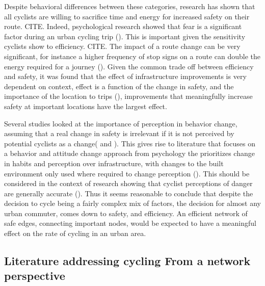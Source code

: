 \documentclass[11pt]{article} %
\begin{document}
Despite behavioral differences between these categories, research has shown that all cyclists are willing to sacrifice time and energy for increased safety on their route. CITE. Indeed, psychological research showed that fear is a significant factor during an urban cycling trip (\cite{ellett2018state}). This is important given the sensitivity cyclists show to efficiency. CITE. The impact of a route change can be very significant, for instance a higher frequency of stop signs on a route can double the energy required for a journey (\cite{fajans2001bicyclists}). Given the common trade off between efficiency and safety, it was found that the effect of infrastructure improvements is very dependent on context, effect is a function of the change in safety, and the importance of the location to trips (\cite{kondo2018bike}), improvements that meaningfully increase safety at important locations have the largest effect. 

Several studies looked at the importance of perception in behavior change, assuming that a real change in safety is irrelevant if it is not perceived by potential cyclists as a change(\cite{li2012physical} and \cite{parkin2007models}). This gives rise to literature that focuses on a behavior and attitude change approach from psychology the prioritizes change in habits and perception over infrastructure, with changes to the built environment only used where required to change perception (\cite{savan2017integrated}). This should be considered in the context of research showing that cyclist perceptions of danger are generally accurate (\cite{vandenbulcke2014predicting}). Thus it seems reasonable to conclude that despite the decision to cycle being a fairly complex mix of factors, the decision for almost any urban commuter, comes down to safety, and efficiency. An efficient network of safe edges, connecting important nodes, would be expected to have a meaningful effect on the rate of cycling in an urban area.  


\subsection{Literature addressing cycling From a network perspective}
\end{document}
